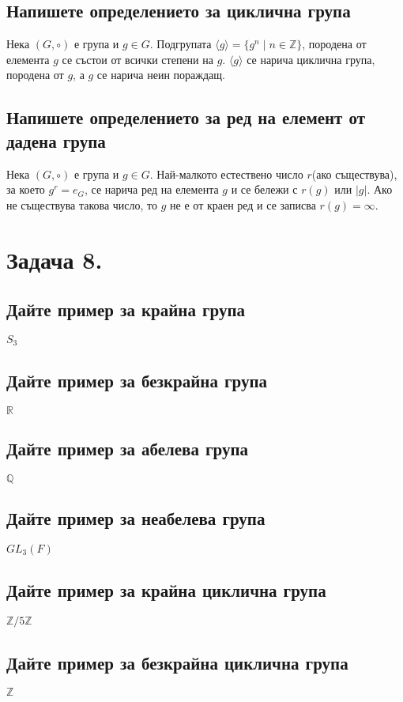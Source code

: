 \documentclass[10pt]{article}
\newcommand*{\Z}{\mathbb{Z}}
\newcommand*{\R}{\mathbb{R}}
\newcommand*{\Q}{\mathbb{Q}}
\begin{document}
\subsection*{Напишете определението за циклична група}
Нека $(G, \circ)$ е група и $g \in G$. Подгрупата $\langle g \rangle = \{g^n \mid n \in \Z\}$, породена от елемента $g$ се състои от всички степени на $g$. $\langle g \rangle$ се нарича циклична група, породена от $g$, а $g$ се нарича неин пораждащ.

\subsection*{Напишете определението за ред на елемент от дадена група}
Нека $(G, \circ)$ е група и $g \in G$. Най-малкото естествено число $r$(ако съществува), за което $g^r = e_G$, се нарича ред на елемента $g$ и се бележи с $r(g)$ или $|g|$. Ако не съществува такова число, то $g$ не е от краен ред и се записва $r(g) = \infty$.

\section*{Задача 8.}

\subsection*{Дайте пример за крайна група}
$S_3$
\subsection*{Дайте пример за безкрайна група}
$\R$

\subsection*{Дайте пример за абелева група}
$\Q$

\subsection*{Дайте пример за неабелева група}
$GL_3(F)$

\subsection*{Дайте пример за крайна циклична група}
$\Z/5\Z$

\subsection*{Дайте пример за безкрайна циклична група}
$\Z$
\end{document}
